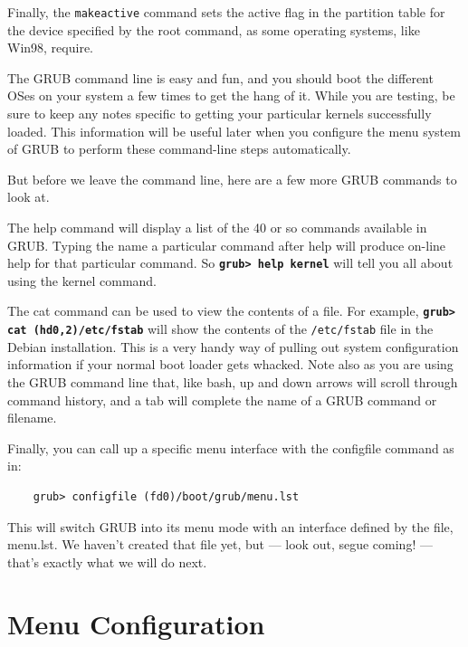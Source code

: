 \documentclass{article}
\begin{document}
Finally, the \texttt{makeactive} command sets the active flag in the partition table for the device specified by the root command, as some operating systems, like Win98, require.

The GRUB command line is easy and fun, and you should boot the different OSes on your system a few times to get the hang of it. While you are testing, be sure to keep any notes specific to getting your particular kernels successfully loaded. This information will be useful later when you configure the menu system of GRUB to perform these command-line steps automatically.

But before we leave the command line, here are a few more GRUB commands to look at.

The help command will display a list of the 40 or so commands available in GRUB. Typing the name a particular command after help will produce on-line help for that particular command. So \textbf{\texttt{grub> help kernel}} will tell you all about using the kernel command.

The cat command can be used to view the contents of a file. For example, \textbf{\texttt{grub> cat (hd0,2)/etc/fstab}} will show the contents of the \texttt{/etc/fstab} file in the Debian installation. This is a very handy way of pulling out system configuration information if your normal boot loader gets whacked. Note also as you are using the GRUB command line that, like bash, up and down arrows will scroll through command history, and a tab will complete the name of a GRUB command or filename.

Finally, you can call up a specific menu interface with the configfile command as in:

\begin{verbatim}
    grub> configfile (fd0)/boot/grub/menu.lst
\end{verbatim}

This will switch GRUB into its menu mode with an interface defined by the file, menu.lst. We haven't created that file yet, but — look out, segue coming! — that's exactly what we will do next.


















\section{Menu Configuration}
\end{document}
